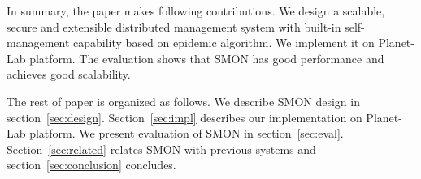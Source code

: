 

In summary, the paper makes following contributions.  We
design a scalable, secure and extensible distributed
management system with built-in self-management capability
based on epidemic algorithm.  We implement it on Planet-Lab
platform.  The evaluation shows that SMON has good
performance and achieves good scalability.

The rest of paper is organized as follows. We describe SMON
design in section~\ref{sec:design}. Section~\ref{sec:impl}
describes our implementation on Planet-Lab platform. We
present evaluation of SMON in section~\ref{sec:eval}.
Section~\ref{sec:related} relates SMON with previous systems
and section~\ref{sec:conclusion} concludes.


